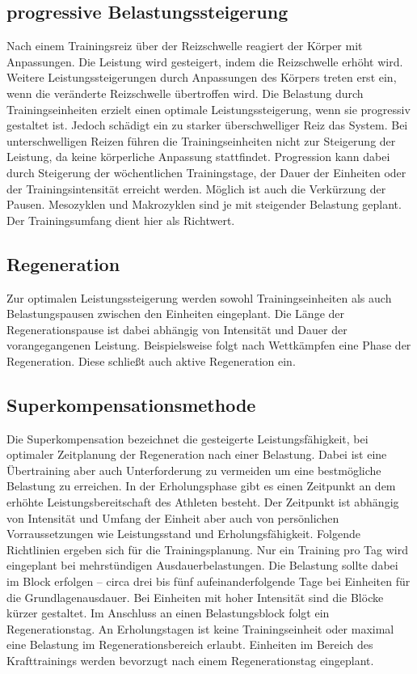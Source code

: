 \subsection{progressive Belastungssteigerung}
    Nach einem Trainingsreiz über der Reizschwelle reagiert der Körper mit Anpassungen. Die Leistung wird gesteigert, indem die Reizschwelle erhöht wird. Weitere Leistungssteigerungen durch Anpassungen des Körpers treten erst ein, wenn die veränderte Reizschwelle übertroffen wird. Die Belastung durch Trainingseinheiten erzielt einen optimale Leistungssteigerung, wenn sie progressiv gestaltet ist. Jedoch schädigt ein zu starker überschwelliger Reiz das System. Bei unterschwelligen Reizen führen die Trainingseinheiten nicht zur Steigerung der Leistung, da keine körperliche Anpassung stattfindet. \cite[58]{Seidenspinner2005} Progression kann dabei durch Steigerung der wöchentlichen Trainingstage, der Dauer der Einheiten oder der Trainingsintensität erreicht werden. Möglich ist auch die Verkürzung der Pausen.\newline 
    Mesozyklen und Makrozyklen sind je mit steigender Belastung geplant. Der Trainingsumfang dient hier als Richtwert. \cite[60-61]{Radsporttraining}
\subsection{Regeneration}
    Zur optimalen Leistungssteigerung werden sowohl Trainingseinheiten als auch Belastungspausen zwischen den Einheiten eingeplant. Die Länge der Regenerationspause ist dabei abhängig von Intensität und Dauer der vorangegangenen Leistung. Beispielsweise folgt nach Wettkämpfen eine Phase der Regeneration. Diese schließt auch aktive Regeneration ein. 
\subsection{Superkompensationsmethode}
    Die Superkompensation bezeichnet die gesteigerte Leistungsfähigkeit, bei optimaler Zeitplanung der Regeneration nach einer Belastung.\cite[163]{Trainingswissenschaft} Dabei ist eine Übertraining aber auch Unterforderung zu vermeiden um eine bestmögliche Belastung zu erreichen. In der Erholungsphase gibt es einen Zeitpunkt an dem erhöhte Leistungsbereitschaft des Athleten  besteht. Der Zeitpunkt ist abhängig von Intensität und Umfang der Einheit aber auch von persönlichen Vorraussetzungen wie Leistungsstand und Erholungsfähigkeit. \newline
    Folgende Richtlinien ergeben sich für die Trainingsplanung. \cite[44-46]{Radsporttraining} Nur ein Training pro Tag wird eingeplant bei mehrstündigen Ausdauerbelastungen. Die Belastung sollte dabei im Block erfolgen -- circa drei bis fünf aufeinanderfolgende Tage bei Einheiten für die Grundlagenausdauer. Bei Einheiten mit hoher Intensität sind die Blöcke kürzer gestaltet. Im Anschluss an einen Belastungsblock folgt ein Regenerationstag. An Erholungstagen ist keine Trainingseinheit oder maximal eine Belastung im Regenerationsbereich erlaubt. Einheiten im Bereich des Krafttrainings werden bevorzugt nach einem Regenerationstag eingeplant. 

